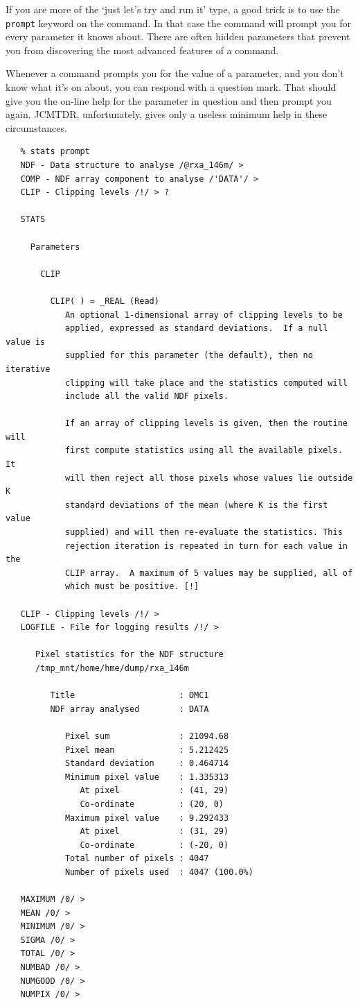 \documentclass[11pt]{article}
\begin{document}
   If you are more of the `just let's try and run it' type, a good trick
   is to use the {\tt prompt} keyword on the command. In that case
   the command will prompt you for every parameter it knows about. There
   are often hidden parameters that prevent you from discovering the
   most advanced features of a command.

   Whenever a command prompts you for the value of a parameter, and you
   don't know what it's on about, you can respond with a question mark.
   That should give you the on-line help for the parameter in question
   and then prompt you again. JCMTDR, unfortunately, gives only a
   useless minimum help in these circumstances.

\begin{verbatim}
   % stats prompt
   NDF - Data structure to analyse /@rxa_146m/ >
   COMP - NDF array component to analyse /'DATA'/ >
   CLIP - Clipping levels /!/ > ?

   STATS

     Parameters

       CLIP

         CLIP( ) = _REAL (Read)
            An optional 1-dimensional array of clipping levels to be
            applied, expressed as standard deviations.  If a null value is
            supplied for this parameter (the default), then no iterative
            clipping will take place and the statistics computed will
            include all the valid NDF pixels.

            If an array of clipping levels is given, then the routine will
            first compute statistics using all the available pixels. It
            will then reject all those pixels whose values lie outside K
            standard deviations of the mean (where K is the first value
            supplied) and will then re-evaluate the statistics. This
            rejection iteration is repeated in turn for each value in the
            CLIP array.  A maximum of 5 values may be supplied, all of
            which must be positive. [!]

   CLIP - Clipping levels /!/ >
   LOGFILE - File for logging results /!/ >

      Pixel statistics for the NDF structure
      /tmp_mnt/home/hme/dump/rxa_146m

         Title                     : OMC1
         NDF array analysed        : DATA

            Pixel sum              : 21094.68
            Pixel mean             : 5.212425
            Standard deviation     : 0.464714
            Minimum pixel value    : 1.335313
               At pixel            : (41, 29)
               Co-ordinate         : (20, 0)
            Maximum pixel value    : 9.292433
               At pixel            : (31, 29)
               Co-ordinate         : (-20, 0)
            Total number of pixels : 4047
            Number of pixels used  : 4047 (100.0%)

   MAXIMUM /0/ >
   MEAN /0/ >
   MINIMUM /0/ >
   SIGMA /0/ >
   TOTAL /0/ >
   NUMBAD /0/ >
   NUMGOOD /0/ >
   NUMPIX /0/ >
\end{verbatim}
\end{document}
